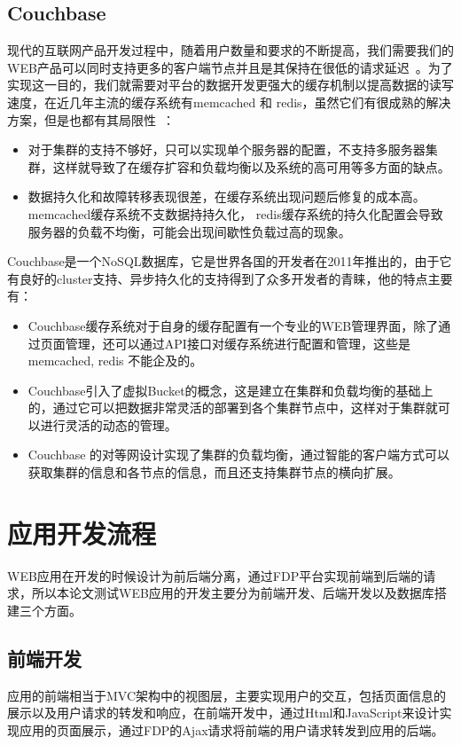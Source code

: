 \subsection{Couchbase}
现代的互联网产品开发过程中，随着用户数量和要求的不断提高，我们需要我们的WEB产品可以同时支持更多的客户端节点并且是其保持在很低的请求延迟~\cite{brown2012getting}。为了实现这一目的，我们就需要对平台的数据开发更强大的缓存机制以提高数据的读写速度，在近几年主流的缓存系统有memcached 和 redis，虽然它们有很成熟的解决方案，但是也都有其局限性~\cite{kovacs2013cassandra}：

\begin{itemize}
\item 对于集群的支持不够好，只可以实现单个服务器的配置，不支持多服务器集群，这样就导致了在缓存扩容和负载均衡以及系统的高可用等多方面的缺点。
\item 数据持久化和故障转移表现很差，在缓存系统出现问题后修复的成本高。memcached缓存系统不支数据持持久化， redis缓存系统的持久化配置会导致服务器的负载不均衡，可能会出现间歇性负载过高的现象。
\end{itemize}
Couchbase是一个NoSQL数据库，它是世界各国的开发者在2011年推出的，由于它有良好的cluster支持、异步持久化的支持得到了众多开发者的青睐，他的特点主要有：
\begin{itemize}
\item Couchbase缓存系统对于自身的缓存配置有一个专业的WEB管理界面，除了通过页面管理，还可以通过API接口对缓存系统进行配置和管理，这些是memcached, redis 不能企及的。
\item Couchbase引入了虚拟Bucket的概念，这是建立在集群和负载均衡的基础上的，通过它可以把数据非常灵活的部署到各个集群节点中，这样对于集群就可以进行灵活的动态的管理。
\item Couchbase 的对等网设计实现了集群的负载均衡，通过智能的客户端方式可以获取集群的信息和各节点的信息，而且还支持集群节点的横向扩展。

\end{itemize}
\section{应用开发流程}
WEB应用在开发的时候设计为前后端分离，通过FDP平台实现前端到后端的请求，所以本论文测试WEB应用的开发主要分为前端开发、后端开发以及数据库搭建三个方面。
\subsection{前端开发}
应用的前端相当于MVC架构中的视图层，主要实现用户的交互，包括页面信息的展示以及用户请求的转发和响应，在前端开发中，通过Html和JavaScript来设计实现应用的页面展示，通过FDP的Ajax请求将前端的用户请求转发到应用的后端。
